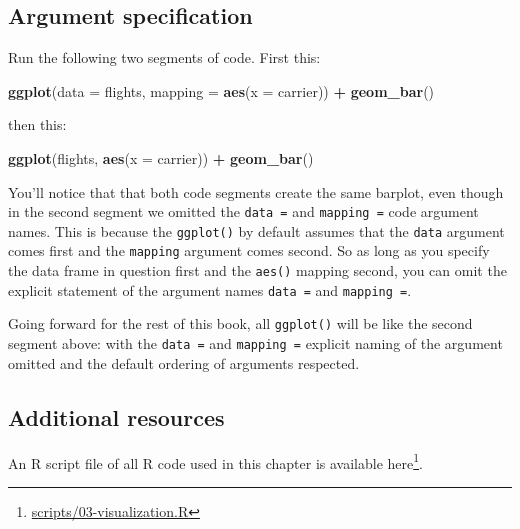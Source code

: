 \documentclass[12pt, krantz2,]{krantz}
\makeatletter
\newenvironment{Shaded}{\begin{snugshade}}{\end{snugshade}}
\newcommand{\DataTypeTok}[1]{\textcolor[rgb]{0.27,0.27,0.27}{#1}}
\newcommand{\KeywordTok}[1]{\textcolor[rgb]{0.27,0.27,0.27}{\textbf{#1}}}
\newcommand{\NormalTok}[1]{#1}
\newcommand{\OperatorTok}[1]{\textcolor[rgb]{0.43,0.43,0.43}{\textbf{#1}}}
\newcommand{\StringTok}[1]{\textcolor[rgb]{0.5,0.5,0.5}{#1}}
\renewcommand{\href}[2]{#2\footnote{\url{#1}}}
\newenvironment{kframe}{%
\medskip{}
\setlength{\fboxsep}{.8em}
 \def\at@end@of@kframe{}%
 \ifinner\ifhmode%
  \def\at@end@of@kframe{\end{minipage}}%
  \begin{minipage}{\columnwidth}%
 \fi\fi%
 \def\FrameCommand##1{\hskip\@totalleftmargin \hskip-\fboxsep
 \colorbox{shadecolor}{##1}\hskip-\fboxsep
     \hskip-\linewidth \hskip-\@totalleftmargin \hskip\columnwidth}%
 \MakeFramed {\advance\hsize-\width
   \@totalleftmargin\z@ \linewidth\hsize
   \@setminipage}}%
 {\par\unskip\endMakeFramed%
 \at@end@of@kframe}
\renewenvironment{Shaded}{\begin{kframe}}{\end{kframe}}
\makeatother
\begin{document}
\hypertarget{argument-specification}{%
\subsection{Argument specification}\label{argument-specification}}

Run the following two segments of code. First this:

\begin{Shaded}
\begin{Highlighting}[]
\KeywordTok{ggplot}\NormalTok{(}\DataTypeTok{data =}\NormalTok{ flights, }\DataTypeTok{mapping =} \KeywordTok{aes}\NormalTok{(}\DataTypeTok{x =}\NormalTok{ carrier)) }\OperatorTok{+}
\StringTok{  }\KeywordTok{geom_bar}\NormalTok{()}
\end{Highlighting}
\end{Shaded}

then this:

\begin{Shaded}
\begin{Highlighting}[]
\KeywordTok{ggplot}\NormalTok{(flights, }\KeywordTok{aes}\NormalTok{(}\DataTypeTok{x =}\NormalTok{ carrier)) }\OperatorTok{+}
\StringTok{  }\KeywordTok{geom_bar}\NormalTok{()}
\end{Highlighting}
\end{Shaded}

You'll notice that that both code segments create the same barplot, even though in the second segment we omitted the \texttt{data\ =} and \texttt{mapping\ =} code argument names. This is because the \texttt{ggplot()} by default assumes that the \texttt{data} argument comes first and the \texttt{mapping} argument comes second. So as long as you specify the data frame in question first and the \texttt{aes()} mapping second, you can omit the explicit statement of the argument names \texttt{data\ =} and \texttt{mapping\ =}.

Going forward for the rest of this book, all \texttt{ggplot()} will be like the second segment above: with the \texttt{data\ =} and \texttt{mapping\ =} explicit naming of the argument omitted and the default ordering of arguments respected.

\hypertarget{additional-resources-1}{%
\subsection{Additional resources}\label{additional-resources-1}}

An R script file of all R code used in this chapter is available \href{scripts/03-visualization.R}{here}.
\end{document}
